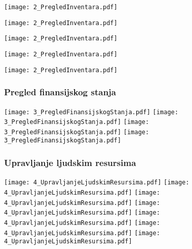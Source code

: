 \documentclass{article}
\begin{document}
\texttt{[image: 2\_PregledInventara.pdf]}

\texttt{[image: 2\_PregledInventara.pdf]}

\texttt{[image: 2\_PregledInventara.pdf]}

\texttt{[image: 2\_PregledInventara.pdf]}

\texttt{[image: 2\_PregledInventara.pdf]}


\subsubsection{Pregled finansijskog stanja}

\texttt{[image: 3\_PregledFinansijskogStanja.pdf]}
\texttt{[image: 3\_PregledFinansijskogStanja.pdf]}
\texttt{[image: 3\_PregledFinansijskogStanja.pdf]}
\texttt{[image: 3\_PregledFinansijskogStanja.pdf]}


\subsubsection{Upravljanje ljudskim resursima}

\texttt{[image: 4\_UpravljanjeLjudskimResursima.pdf]}
\texttt{[image: 4\_UpravljanjeLjudskimResursima.pdf]}
\texttt{[image: 4\_UpravljanjeLjudskimResursima.pdf]}
\texttt{[image: 4\_UpravljanjeLjudskimResursima.pdf]}
\texttt{[image: 4\_UpravljanjeLjudskimResursima.pdf]}
\texttt{[image: 4\_UpravljanjeLjudskimResursima.pdf]}
\texttt{[image: 4\_UpravljanjeLjudskimResursima.pdf]}
\end{document}
